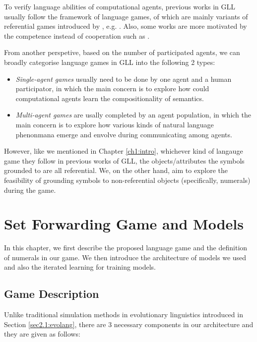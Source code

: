 \documentclass[msc,deptreport]{infthesis} %
\begin{document}
To verify language abilities of computational agents, previous works in GLL usually follow the framework of language games, of which are mainly variants of referential games introduced by \cite{lewis2008convention}, e.g. \cite{hermann2017grounded, havrylov2017emergence}. Also, some works are more motivated by the competence instead of cooperation such as \cite{cao2018emergent}.

From another perspetive, based on the number of participated agents, we can broadly categorise language games in GLL into the following 2 types:
\begin{itemize}
  \item \textit{Single-agent games} usually need to be done by one agent and a human participator, in which the main concern is to explore how could computational agents learn the compositionality of semantics.
  \item \textit{Multi-agent games} are usally completed by an agent population, in which the main concern is to explore how various kinds of natural language phenonmana emerge and envolve during communicating among agents.
\end{itemize}

However, like we mentioned in Chapter \ref{ch1:intro}, whichever kind of langauge game they follow in previous works of GLL, the objects/attributes the symbols grounded to are all referential. We, on the other hand, aim to explore the feasibility of grounding symbols to non-referential objects (specifically, numerals) during the game.


\chapter{Set Forwarding Game and Models}
\label{ch3:game_model}

In this chapter, we first describe the proposed language game and the definition of numerals in our game. We then introduce the architecture of models we used and also the iterated learning for training models.

\section{Game Description}
\label{sec3.1:game_description}

Unlike traditional simulation methods in evolutionary linguistics introduced in Section \ref{sec2.1:evolang}, there are 3 necessary components in our architecture and they are given as follows:
\end{document}
